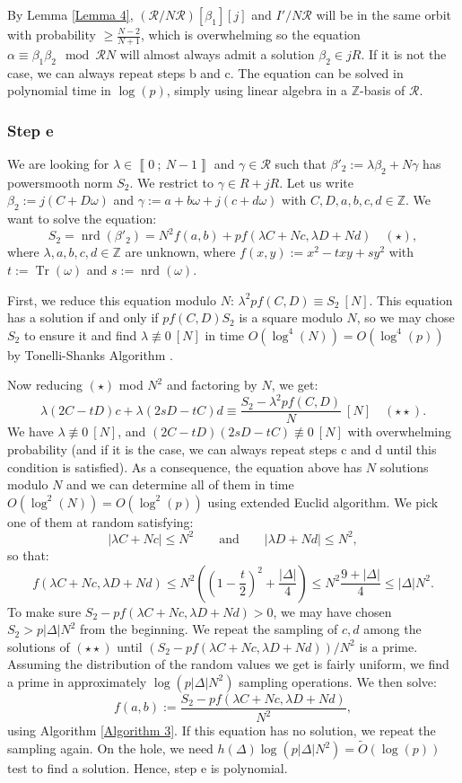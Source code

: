 \documentclass[a4paper,10pt,notitlepage]{report}
\theoremstyle{definition}
\theoremstyle{plain}
\theoremstyle{definition}
\newcommand{\Z}{\mathbb{Z}}
\newcommand{\m}[1]{\mathcal{#1}}
\renewcommand{\i}[2]{\left\llbracket #1~;~#2\right\rrbracket}
\renewcommand{\(}{\left(}
\renewcommand{\)}{\right)}
\DeclareMathOperator{\Tr}{Tr}
\DeclareMathOperator{\nrd}{nrd}
\begin{document}
By Lemma \ref{Lemma 4}, $(\m{R}/N\m{R})[\beta_1][j]$ and $I'/N\m{R}$ will be in the same orbit with probability $\geq \frac{N-2}{N+1}$, which is overwhelming so the equation $\alpha\equiv\beta_1\beta_2 \mod \m{R}N$ will almost always admit a solution $\beta_2\in jR$. If it is not the case, we can always repeat steps b and c. The equation can be solved in polynomial time in $\log(p)$, simply using linear algebra in a $\Z$-basis of $\m{R}$.

\subsubsection{Step e}

We are looking for $\lambda\in\i{0}{N-1}$ and $\gamma\in\m{R}$ such that $\beta'_2:=\lambda\beta_2+N\gamma$ has powersmooth norm $S_2$.  We restrict to $\gamma\in R+jR$. Let us write $\beta_2:=j(C+D\omega)$ and $\gamma:=a+b\omega+j(c+d\omega)$ with $C, D, a,b,c,d\in\Z$. We want to solve the equation:
\[S_2=\nrd(\beta'_2)=N^2f(a,b)+pf(\lambda C+Nc,\lambda D+Nd)\quad (\star),\]
where $\lambda,a,b,c,d\in\Z$ are unknown, where $f(x,y):=x^2-txy+sy^2$ with $t:=\Tr(\omega)$ and $s:=\nrd(\omega)$. 

First, we reduce this equation modulo $N$: $\lambda^2 p f(C,D)\equiv S_2 \ [N]$. This equation has a solution if and only if $p f(C,D) S_2$ is a square modulo $N$, so we may chose $S_2$ to ensure it and find $\lambda\not\equiv 0 \ [N]$ in time $O(\log^4(N))=O(\log^4(p))$ by Tonelli-Shanks Algorithm \cite[Algorithm 1.5.1]{Cohen1}.  

Now reducing $(\star)$ mod $N^2$ and factoring by $N$, we get:
\[\lambda(2C-tD)c+\lambda(2sD-tC)d\equiv \frac{S_2-\lambda^2 p f(C,D)}{N} \ [N]\quad (\star\star).\]
We have $\lambda\not\equiv 0 \ [N]$, and $(2C-tD)(2sD-tC)\not\equiv 0 \ [N]$ with overwhelming probability (and if it is the case, we can always repeat steps c and d until this condition is satisfied). As a consequence, the equation above has $N$ solutions modulo $N$ and we can determine all of them in time $O(\log^2(N))=O(\log^2(p))$ using extended Euclid algorithm.  We pick one of them at random satisfying:
\[|\lambda C+Nc|\leq N^2 \qquad \mbox{and} \qquad |\lambda D+Nd|\leq N^2,\]
so that:
\[f(\lambda C+Nc,\lambda D+Nd)\leq N^2\(\(1-\frac{t}{2}\)^2+\frac{|\Delta|}{4}\)\leq N^2\frac{9+|\Delta|}{4}\leq |\Delta|N^2.\]
To make sure $S_2-pf(\lambda C+Nc,\lambda D+Nd)>0$, we may have chosen $S_2>p|\Delta|N^2$ from the beginning. We repeat the sampling of $c,d$ among the solutions of $(\star\star)$ until $(S_2-pf(\lambda C+Nc,\lambda D+Nd))/N^2$ is a prime. Assuming the distribution of the random values we get is fairly uniform, we find a prime in approximately $\log(p|\Delta|N^2)$ sampling operations. We then solve:
\[f(a,b):=\frac{S_2-pf(\lambda C+Nc,\lambda D+Nd)}{N^2},\]
using Algorithm \ref{Algorithm 3}. If this equation has no solution, we repeat the sampling again. On the hole, we need $h(\Delta)\log(p|\Delta|N^2)=\tilde{O}(\log(p))$ test to find a solution. Hence, step e is polynomial.
\end{document}
